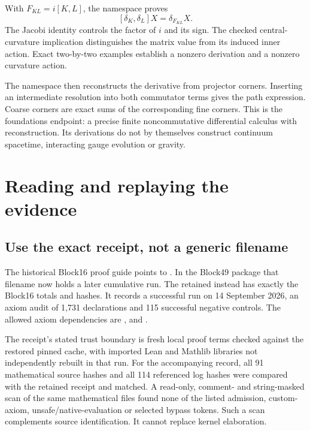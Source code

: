 With \(F_{KL}=i[K,L]\), the namespace  proves
\[
 [\delta_K,\delta_L]X=\delta_{F_{KL}}X.
\]
The Jacobi identity controls the factor of \(i\) and its sign. The checked central-curvature implication distinguishes the matrix value from its induced inner action. Exact two-by-two examples establish a nonzero derivation and a nonzero curvature action.

The namespace  then reconstructs the derivative from projector corners. Inserting an intermediate resolution into both commutator terms gives the path expression. Coarse corners are exact sums of the corresponding fine corners. This is the foundations endpoint: a precise finite noncommutative differential calculus with reconstruction. Its derivations do not by themselves construct continuum spacetime, interacting gauge evolution or gravity.

\section{Reading and replaying the evidence}

\subsection{Use the exact receipt, not a generic filename}

The historical Block16 proof guide points to . In the Block49 package that filename now holds a later cumulative run. The retained  instead has exactly the Block16 totals and hashes. It records a successful run on 14 September 2026, an axiom audit of 1,731 declarations and 115 successful negative controls. The allowed axiom dependencies are ,  and .

The receipt's stated trust boundary is fresh local proof terms checked against the restored pinned cache, with imported Lean and Mathlib libraries not independently rebuilt in that run. For the accompanying record, all 91 mathematical source hashes and all 114 referenced log hashes were compared with the retained receipt and matched. A read-only, comment- and string-masked scan of the same mathematical files found none of the listed admission, custom-axiom, unsafe/native-evaluation or selected bypass tokens. Such a scan complements source identification. It cannot replace kernel elaboration.

